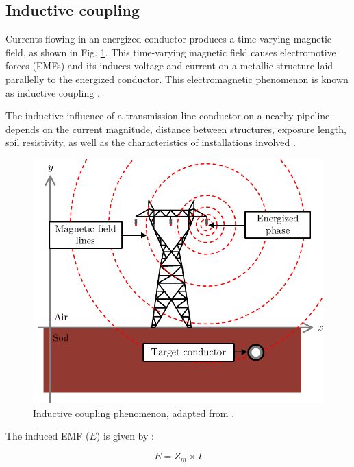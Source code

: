 \documentclass{IEEEtran4PSCC}
\begin{document}
\subsection{Inductive coupling}

Currents flowing in an energized conductor produces a time-varying magnetic field, as shown in Fig. \ref{fig:InductiveCoupling}. This time-varying magnetic field causes electromotive forces (EMFs) and its induces voltage and current on a metallic structure laid parallelly to the energized conductor. This electromagnetic phenomenon is known as inductive coupling \cite{CIGREWG36}.

The inductive influence of a transmission line conductor on a nearby pipeline depends on the current magnitude, distance between structures, exposure length, soil resistivity, as well as the characteristics of installations involved \cite{CIGREWG36}.

\begin{figure}[hbt]
	\begin{center}
		\includegraphics[width=1\columnwidth]{./fig/induc_coup.pdf}
		\caption{Inductive coupling phenomenon, adapted from \cite{Martins-Britto2020}.}
		\label{fig:InductiveCoupling}
	\end{center}
\end{figure}

The induced EMF ($E$) is given by \cite{CIGREWG36}:

\begin{equation}
		E = Z_{m} \times I
\end{equation}
\end{document}
